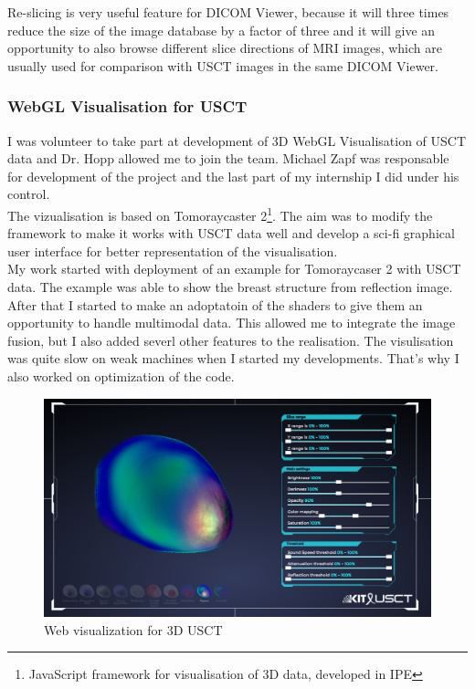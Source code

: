 \documentclass[english]{article}
\begin{document}
Re-slicing is very useful feature for DICOM Viewer, because it will three times reduce the size of the image database by a factor of three and it will give an opportunity to also browse different slice directions of MRI images, which are usually used for comparison with USCT images in the same DICOM Viewer.\\

\subsubsection{WebGL Visualisation for USCT}

I was volunteer to take part at development of 3D WebGL Visualisation of USCT data and Dr. Hopp allowed me to join the team. Michael Zapf was responsable for development of the project and the last part of my internship I did under his control.\\

The vizualisation is based on Tomoraycaster 2\footnote{JavaScript framework for visualisation of 3D data, developed in IPE}. The aim was to modify the framework to make it works with USCT data well and develop a sci-fi graphical user interface for better representation of the visualisation.\\

My work started with deployment of an example for Tomoraycaser 2 with USCT data. The example was able to show the breast structure from reflection image. After that I started to make an adoptatoin of the shaders to give them an opportunity to handle multimodal data. This allowed me to integrate the image fusion, but I also added severl other features to the realisation. The visulisation was quite slow on weak machines when I started my developments. That's why I also worked on optimization of the code.\\

\begin{figure}[H]
\centerline{\includegraphics[scale=0.35]{internship_report/usct}}
\caption{Web visualization for 3D USCT\label{fig:usct}}
\end{figure}
\end{document}
